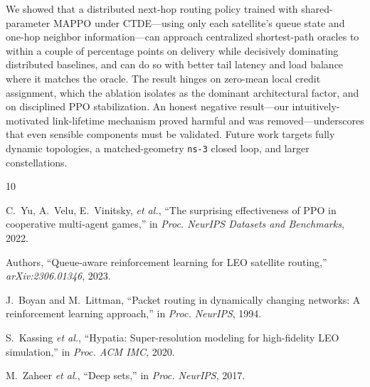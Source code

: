 \documentclass[conference,10pt]{IEEEtran}
\begin{document}
We showed that a distributed next-hop routing policy trained with shared-parameter MAPPO under CTDE---using only each satellite's queue state and one-hop neighbor information---can approach centralized shortest-path oracles to within a couple of percentage points on delivery while decisively dominating distributed baselines, and can do so with better tail latency and load balance where it matches the oracle. The result hinges on zero-mean local credit assignment, which the ablation isolates as the dominant architectural factor, and on disciplined PPO stabilization. An honest negative result---our intuitively-motivated link-lifetime mechanism proved harmful and was removed---underscores that even sensible components must be validated. Future work targets fully dynamic topologies, a matched-geometry \texttt{ns-3} closed loop, and larger constellations.


\begin{thebibliography}{10}

C.~Yu, A.~Velu, E.~Vinitsky, \emph{et al.}, ``The surprising effectiveness of PPO in cooperative multi-agent games,'' in \emph{Proc. NeurIPS Datasets and Benchmarks}, 2022.

Authors, ``Queue-aware reinforcement learning for LEO satellite routing,'' \emph{arXiv:2306.01346}, 2023.

J.~Boyan and M.~Littman, ``Packet routing in dynamically changing networks: A reinforcement learning approach,'' in \emph{Proc. NeurIPS}, 1994.

S.~Kassing \emph{et al.}, ``Hypatia: Super-resolution modeling for high-fidelity LEO simulation,'' in \emph{Proc. ACM IMC}, 2020.

M.~Zaheer \emph{et al.}, ``Deep sets,'' in \emph{Proc. NeurIPS}, 2017.

\end{thebibliography}
\end{document}
